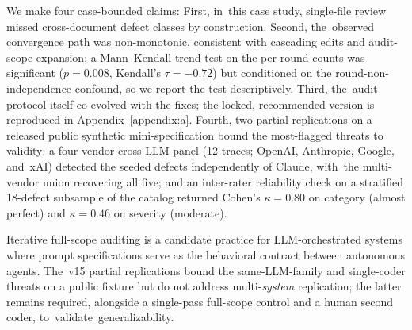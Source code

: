 \documentclass[software,article,accept,pdftex,oneauthor]{Definitions/mdpi}
\begin{document}
We make four case-bounded claims: First, in~this case study, single-file review missed cross-document defect classes by construction. Second, the~observed convergence path was non-monotonic, consistent with cascading edits and audit-scope expansion; a Mann--Kendall trend test on the per-round counts was significant ($p = 0.008$, Kendall's $\tau = -0.72$) but conditioned on the round-non-independence confound, so we report the test descriptively. Third, the~audit protocol itself co-evolved with the fixes; the locked, recommended version is reproduced in Appendix~\ref{appendix:a}. Fourth, two partial replications on a released public synthetic mini-specification bound the most-flagged threats to validity: a four-vendor cross-LLM panel (12 traces; OpenAI, Anthropic, Google, and~xAI) detected the seeded defects independently of Claude, with~the multi-vendor union recovering all five; and an inter-rater reliability check on a stratified 18-defect subsample of the catalog returned Cohen's $\kappa = 0.80$ on category (almost perfect) and $\kappa = 0.46$ on severity (moderate).

Iterative full-scope auditing is a candidate practice for LLM-orchestrated systems where prompt specifications serve as the behavioral contract between autonomous agents. The~v15 partial replications bound the same-LLM-family and single-coder threats on a public fixture but do not address multi-\emph{system} replication; the latter remains required, alongside a single-pass full-scope control and a human second coder, to~validate~generalizability.

\vspace{+6pt}

\end{document}
